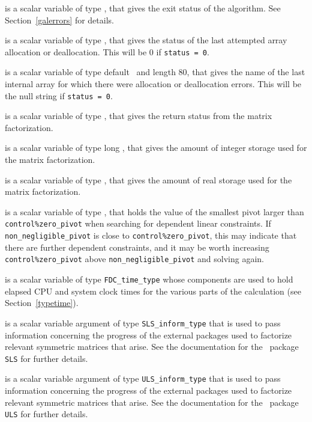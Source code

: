 \documentclass{galahad}
\newcommand{\packagename}{FDC}
\begin{document}
\begin{description}

 is a scalar variable of type \integer, that gives the
exit status of the algorithm.
See Section~\ref{galerrors}
for details.

 is a scalar variable of type \integer, that gives
the status of the last attempted array allocation or deallocation.
This will be 0 if {\tt status = 0}.

 is a scalar variable of type default \character\
and length 80, that  gives the name of the last internal array
for which there were allocation or deallocation errors.
This will be the null string if {\tt status = 0}.

 is a scalar variable of type \integer, that
gives the return status from the matrix factorization.

 is a scalar variable of type long
\integer, that gives the amount of integer storage used for the matrix
factorization.

 is a scalar variable of type \longinteger,
that gives the amount of real storage used for the matrix factorization.

 is a scalar variable of type \realdp,
that holds the value of the smallest pivot larger than
{\tt control\%zero\_pivot}
when searching for dependent linear constraints. If
{\tt non\_negligible\_pivot} is close to  {\tt control\%zero\_pivot},
this may indicate that there are further dependent constraints, and
it may be worth increasing {\tt control\%zero\_pivot} above
{\tt non\_negligible\_pivot} and solving again.

 is a scalar variable of type {\tt \packagename\_time\_type}
whose components are used to hold elapsed CPU and system clock
times for the various parts of the calculation (see Section~\ref{typetime}).

 is a scalar variable argument of type
{\tt SLS\_inform\_type} that is used to pass information
concerning the progress of the external packages used to
factorize relevant symmetric matrices that arise.
See the documentation for the \galahad\ package {\tt SLS} for further details.

 is a scalar variable argument of type
{\tt ULS\_inform\_type} that is used to pass information
concerning the progress of the external packages used to
factorize relevant symmetric matrices that arise.
See the documentation for the \galahad\ package {\tt ULS} for further details.

\end{description}
\end{document}
